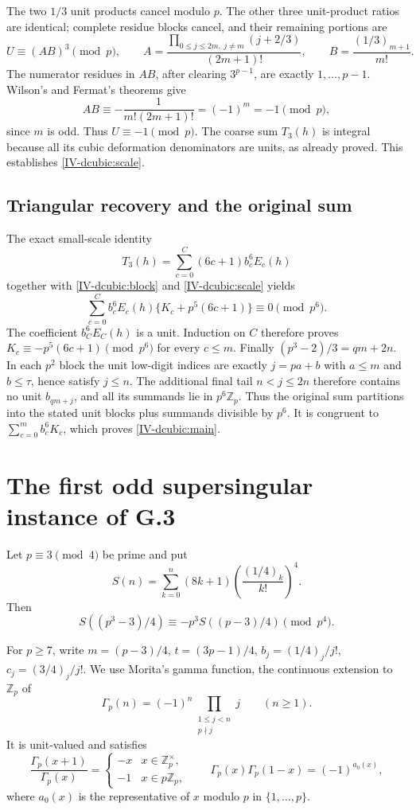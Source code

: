 \documentclass[11pt,letterpaper]{article}
\numberwithin{equation}{section}
\begin{document}
The two $1/3$ unit products cancel modulo $p$. The other three
unit-product ratios are identical; complete residue blocks cancel,
and their remaining portions are
\[
 U\equiv(AB)^3\pmod p,\qquad
 A=\frac{\prod_{0\le j\le2m,\ j\ne m}(j+2/3)}{(2m+1)!},
 \qquad B=\frac{(1/3)_{m+1}}{m!}.
\]
The numerator residues in $AB$, after clearing $3^{p-1}$, are
exactly $1,\ldots,p-1$. Wilson's and Fermat's theorems give
\[
 AB\equiv-\frac1{m!(2m+1)!}=(-1)^m=-1\pmod p,
\]
since $m$ is odd. Thus $U\equiv-1\pmod p$. The coarse sum $T_3(h)$
is integral because all its cubic deformation denominators are
units, as already proved. This establishes \eqref{IV-dcubic:scale}.

\subsection{Triangular recovery and the original sum}
The exact small-scale identity
\[
 T_3(h)=\sum_{c=0}^{C}(6c+1)b_c^6E_c(h)
\]
together with \eqref{IV-dcubic:block} and \eqref{IV-dcubic:scale} yields
\[
 \sum_{c=0}^{C}b_c^6E_c(h)\{K_c+p^5(6c+1)\}\equiv0\pmod{p^6}.
\]
The coefficient $b_C^6E_C(h)$ is a unit. Induction on $C$ therefore
proves $K_c\equiv-p^5(6c+1)\pmod{p^6}$ for every $c\le m$.
Finally $(p^3-2)/3=q m+2n$. In each $p^2$ block the unit
low-digit indices are exactly $j=pa+b$ with $a\le m$ and
$b\le\tau$, hence satisfy $j\le n$. The additional final tail
$n<j\le2n$ therefore contains no unit $b_{qm+j}$, and all its
summands lie in $p^6\mathbb Z_p$. Thus the original sum partitions
into the stated unit blocks plus summands divisible by $p^6$. It is
congruent to $\sum_{c=0}^m b_c^6K_c$, which proves
\eqref{IV-dcubic:main}.

\section{The first odd supersingular instance of G.3}\label{loc-IV-5}
\label{IV-sec:G-r3}
Let $p\equiv3\pmod4$ be prime and put
\[
S(n)=\sum_{k=0}^{n}(8k+1)\left(\frac{(1/4)_k}{k!}\right)^4.
\]
Then
\begin{equation}\label{IV-G:r3}
S((p^3-3)/4)\equiv-p^3S((p-3)/4)\pmod{p^4}.
\end{equation}

For $p\ge7$, write $m=(p-3)/4$, $t=(3p-1)/4$,
$b_j=(1/4)_j/j!$, $c_j=(3/4)_j/j!$.
We use Morita's gamma function, the continuous extension to
$\mathbb Z_p$ of
\[
\Gamma_p(n)=(-1)^n\prod_{\substack{1\le j<n\\p\nmid j}}j
\qquad(n\ge1).
\]
It is unit-valued and satisfies
\[
\frac{\Gamma_p(x+1)}{\Gamma_p(x)}=
\begin{cases}-x&x\in\mathbb Z_p^\times,\\-1&x\in p\mathbb Z_p,\end{cases}
\qquad
\Gamma_p(x)\Gamma_p(1-x)=(-1)^{a_0(x)},
\]
where $a_0(x)$ is the representative of $x$ modulo $p$ in
$\{1,\ldots,p\}$.
\end{document}
